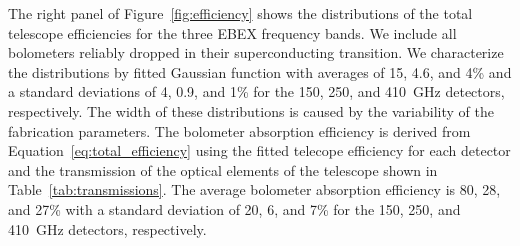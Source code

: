 \documentclass[../EBEXPaper2.tex]{subfiles}
\begin{document}
The right panel of Figure~\ref{fig:efficiency} shows the distributions of the total telescope efficiencies for the three \ac{EBEX} frequency bands.
We include all bolometers reliably dropped in their superconducting transition.
We characterize the distributions by fitted Gaussian function with averages of 15, 4.6, and 4\% and a standard deviations of 4, 0.9, and 1\% for the 150, 250, and 410~GHz detectors, respectively.
The width of these distributions is caused by the variability of the fabrication parameters.
The bolometer absorption efficiency is derived from Equation~\ref{eq:total_efficiency} using the fitted telecope efficiency for each detector and the transmission of the optical elements of the telescope shown in Table~\ref{tab:transmissions}.
The average bolometer absorption efficiency is 80, 28, and 27\% with a standard deviation of 20, 6, and 7\% for the 150, 250, and 410~GHz detectors, respectively.%
\end{document}
